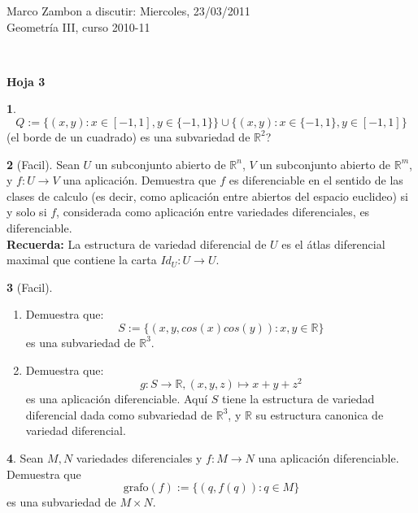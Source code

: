 \documentclass[12pt,a4paper]{report}
\theoremstyle{definition}
\newtheorem{ex}{}
\newcommand{\RR}{\ensuremath{\mathbb R}}
\begin{document}
\noindent
{\sffamily\large Marco Zambon 
\hfill   a discutir:   Miercoles, 23/03/2011\\Geometr\'ia III, curso 2010-11}
 

\noindent
\hrulefill{}\\
\begin{center}\bfseries\large\textsf{Hoja 3    \vspace{-2mm}}
\end{center}

\noindent
 
\begin{ex}
$$Q:=\{(x,y):x\in[-1,1], y\in\{-1,1\}\}\cup \{(x,y): x\in\{-1,1\},y\in[-1,1]\}$$
(el borde de un cuadrado) es  una subvariedad de $\RR^2$?
\end{ex} 

\begin{ex}[Facil]
Sean $U$ un subconjunto abierto de $\RR^n$, $V$ un subconjunto abierto de $\RR^m$, y $f \colon U \to V$ una aplicaci\'on. 
 Demuestra que $f$ es diferenciable en el sentido de las clases de calculo (es decir, como aplicaci\'on entre abiertos del espacio euclideo) si y solo si $f$, considerada como aplicaci\'on entre variedades diferenciales, es diferenciable.
 \\
 \textbf{Recuerda: } La estructura de  variedad diferencial  de $U$ es el \'atlas diferencial maximal que contiene la carta $Id_{U} \colon U \to U$.
\end{ex}

\begin{ex}[Facil]

\begin{enumerate}
\item Demuestra que: $$S:=\{(x,y,cos(x)cos(y)): x,y \in \RR\}$$
es una subvariedad de $\RR^3$. 
\item Demuestra que: $$g \colon S \to \RR, (x,y,z) \mapsto x+y+z^2$$
es una aplicaci\'on diferenciable. Aqu\'i   $S$ tiene  la estructura de variedad diferencial dada como subvariedad de  $\RR^3$, y $\RR$ su estructura canonica  de variedad diferencial.
\end{enumerate}

\end{ex}


\begin{ex}
Sean $M, N$ variedades diferenciales y $f \colon M\to N$ una aplicaci\'on diferenciable. Demuestra que 
$$\text{grafo}(f):=\{(q,f(q)):q\in M\}$$
es una subvariedad de $M\times N$.
\end{ex}
\end{document}
